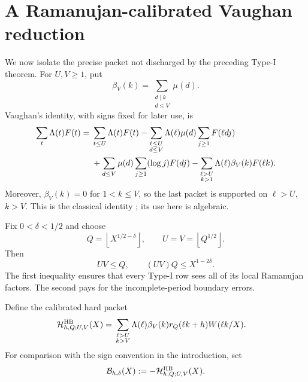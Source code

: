 \section{A Ramanujan-calibrated Vaughan reduction}
\label{sec:vaughan-reduction}

We now isolate the precise packet not discharged by the preceding Type-I
theorem.  For $U,V\geq1$, put
\begin{equation}
 \beta_V(k)=\sum_{\substack{d\mid k\\d\leq V}}\mu(d).
 \label{eq:TPC15-vaughan-beta}
\end{equation}
Vaughan's identity, with signs fixed for later use, is
\begin{align}
 \sum_t\Lambda(t)F(t)
 ={}&\sum_{t\leq U}\Lambda(t)F(t)
 -\sum_{\substack{\ell\leq U\\d\leq V}}
 \Lambda(\ell)\mu(d)\sum_{j\geq1}F(\ell dj)
 \notag\\
 &+\sum_{d\leq V}\mu(d)
 \sum_{j\geq1}(\log j)F(dj)
 -\sum_{\substack{\ell>U\\k>1}}
 \Lambda(\ell)\beta_V(k)F(\ell k).
 \label{eq:TPC15-vaughan-identity}
\end{align}
Moreover, $\beta_V(k)=0$ for $1<k\leq V$, so the last packet is supported
on $\ell>U$, $k>V$.  This is the classical identity
\citep{Vaughan1977,HeathBrown1982}; its use here is algebraic.

Fix $0<\delta<1/2$ and choose
\begin{equation}
 Q=\left\lfloor X^{1/2-\delta}\right\rfloor,
 \qquad
 U=V=\left\lfloor Q^{1/2}\right\rfloor.
 \label{eq:Vaughan-chosen-parameters}
\end{equation}
Then
\begin{equation}
 UV\leq Q,
 \qquad
 (UV)Q\leq X^{1-2\delta}.
 \label{eq:Vaughan-parameter-ledger}
\end{equation}
The first inequality ensures that every Type-I row sees all of its local
Ramanujan factors.  The second pays for the incomplete-period boundary
errors.

Define the calibrated hard packet
\begin{align}
 \mathcal H^{\rm HB}_{h,Q;U,V}(X)
 ={}&\sum_{\substack{\ell>U\\k>V}}
 \Lambda(\ell)\beta_V(k)
 r_Q(\ell k+h)W(\ell k/X).
 \label{eq:HB-hard-packet}
\end{align}
For comparison with the sign convention in the introduction, set
\begin{equation}
 \mathcal B_{h,\delta}(X):=-\mathcal H^{\rm HB}_{h,Q;U,V}(X).
 \label{eq:signed-HB-hard-packet}
\end{equation}

